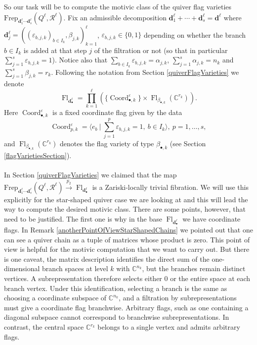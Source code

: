 \documentclass{amsart}
\theoremstyle{plain}
\numberwithin{equation}{section}
\theoremstyle{definition}
\theoremstyle{remark}
\begin{document}
	So our task will be to compute the motivic class of the quiver flag varieties $\text{Frep}_{\mathbf{d}^\ell_1\cdots\mathbf{d}^\ell_s}(Q^\ell,\mathcal{R}^\ell)$. 
	Fix an admissible decomposition $\mathbf{d}_1^\ell+\cdots+\mathbf{d}_s^\ell=\mathbf{d}^\ell$ where $\mathbf{d}_j^\ell=((\varepsilon_{b,j,k})_{b\in I_k},\beta_{j,k})_{k=1}^\ell$, $\varepsilon_{b,j,k}\in\{0,1\} $ depending on whether the branch $b\in I_k$ is added at that step $j$ of the filtration or not (so that in particular $\sum_{j=1}^{s}\varepsilon_{b,j,k}=1$). Notice also that $\sum_{b\in I_k}\varepsilon_{b,j,k}=\alpha_{j,k}$, $\sum_{j=1}^s\alpha_{j,k}=n_k$ and $\sum_{j=1}^s\beta_{j,k}=r_k$. Following the notation from Section \ref{quiverFlagVarieties} we denote
	$$
	\operatorname{Fl}_{\mathbf{d}^\ell_\bullet }=
	\prod_{k=1}^{\ell}(
	\{\operatorname{Coord}_{\bullet,k}^{\varepsilon}\}
	\times
	\operatorname{Fl}_{\beta_{\bullet,k}}(\mathbb C^{r_k})).
	$$
	Here $\operatorname{Coord}_{\bullet,k}^{\varepsilon}$ is a fixed coordinate flag given by the data
	$$
	\operatorname{Coord}_{p,k}^{\varepsilon}=\langle e_b \ | \ \sum_{j=1}^p\varepsilon_{b,j,k}=1,\ b\in I_k \rangle,\ p=1,\ldots,s, 
	$$
	and $\operatorname{Fl}_{\beta_{\bullet,k}}(\mathbb C^{r_k})$ denotes the flag variety of type $\beta_{\bullet,k}$ (see Section \ref{flagVarietiesSection}).  
	\\
	\\
	In Section \ref{quiverFlagVarieties} we claimed that the map $\text{Frep}_{\mathbf{d}^\ell_1\cdots\mathbf{d}^\ell_s}(Q^\ell,\mathcal{R}^\ell)\overset{p_2}{\longrightarrow}\operatorname{Fl}_{\mathbf{d}^\ell_\bullet }$ is a Zariski-locally trivial fibration. We will use this explicitly for the star-shaped quiver case we are looking at and this will lead the way to compute the desired motivic class. There are some points, however, that need to be justified. The first one is why in the base $\operatorname{Fl}_{\mathbf{d}^\ell_\bullet }$ we have coordinate flags. In Remark \ref{anotherPointOfViewStarShapedChains} we pointed out that one can see a quiver chain as a tuple of matrices whose product is zero. This point of view is helpful for the motivic computation that we want to carry out. But there is one caveat,  the matrix description identifies the direct sum of the one-dimensional branch spaces at level $k$ with $\mathbb C^{n_k}$, but the branches remain distinct vertices. A subrepresentation therefore selects either \(0\) or the entire space at each branch vertex. Under this identification, selecting a branch  is the same as choosing a coordinate subspace of $\mathbb C^{n_k}$, and a filtration by subrepresentations must give a coordinate flag branchwise. Arbitrary flags, such as one containing a diagonal subspace cannot correspond to branchwise subrepresentations. In contrast, the central space $\mathbb C^{r_k}$ belongs to a single vertex and admits arbitrary flags.
\end{document}
